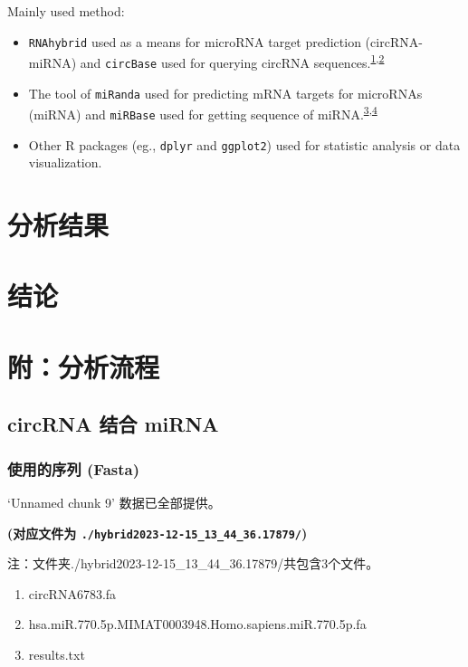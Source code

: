 \documentclass[
]{article}
\providecommand{\tightlist}{%
  \setlength{\itemsep}{0pt}\setlength{\parskip}{0pt}}
\begin{document}
Mainly used method:

\begin{itemize}
\tightlist
\item
  \texttt{RNAhybrid} used as a means for microRNA target prediction (circRNA-miRNA) and \texttt{circBase} used for querying circRNA sequences.\textsuperscript{\protect\hyperlink{ref-FastAndEffectRehmsm2004}{1},\protect\hyperlink{ref-CircbaseADatGlazar2014}{2}}
\item
  The tool of \texttt{miRanda} used for predicting mRNA targets for microRNAs (miRNA) and \texttt{miRBase} used for getting sequence of miRNA.\textsuperscript{\protect\hyperlink{ref-Enrigh2003}{3},\protect\hyperlink{ref-MirbaseFromMKozoma2019}{4}}
\item
  Other R packages (eg., \texttt{dplyr} and \texttt{ggplot2}) used for statistic analysis or data visualization.
\end{itemize}

\hypertarget{results}{%
\section{分析结果}\label{results}}

\hypertarget{dis}{%
\section{结论}\label{dis}}

\hypertarget{workflow}{%
\section{附：分析流程}\label{workflow}}

\hypertarget{circrna-ux7ed3ux5408-mirna}{%
\subsection{circRNA 结合 miRNA}\label{circrna-ux7ed3ux5408-mirna}}

\hypertarget{ux4f7fux7528ux7684ux5e8fux5217-fasta}{%
\subsubsection{使用的序列 (Fasta)}\label{ux4f7fux7528ux7684ux5e8fux5217-fasta}}

`Unnamed chunk 9' 数据已全部提供。

\textbf{(对应文件为 \texttt{./hybrid2023-12-15\_13\_44\_36.17879/})}

\begin{center}\begin{tcolorbox}[colback=gray!10, colframe=gray!50, width=0.9\linewidth, arc=1mm, boxrule=0.5pt]注：文件夹./hybrid2023-12-15\_13\_44\_36.17879/共包含3个文件。

\begin{enumerate}\tightlist
\item circRNA6783.fa
\item hsa.miR.770.5p.MIMAT0003948.Homo.sapiens.miR.770.5p.fa
\item results.txt
\end{enumerate}\end{tcolorbox}
\end{center}
\end{document}
